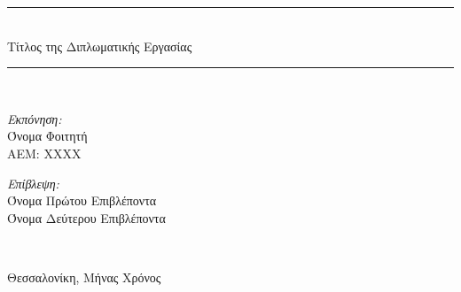 \begin{titlepage}
\begin{center}
    \rule{450pt}{4pt} \\[0.4cm]
    {\fontsize{20.26pt}{1em}\selectfont Τίτλος της Διπλωματικής Εργασίας}

    \rule{350pt}{4pt} \\[4cm]

    \begin{minipage}{0.4\textwidth}
      \begin{flushleft} \large
        \emph{Εκπόνηση:} \\
        Όνομα Φοιτητή \\
        ΑΕΜ: ΧΧΧΧ
      \end{flushleft}
    \end{minipage}
    \begin{minipage}{0.45\textwidth}
      \begin{flushright} \large
        \emph{Επίβλεψη:} \\
        Όνομα Πρώτου Επιβλέποντα\\
        Όνομα Δεύτερου Επιβλέποντα\\
      \end{flushright}
    \end{minipage}
    \\[1cm]
    \vfill

    \large Θεσσαλονίκη, Μήνας Χρόνος

  \end{center}
\end{titlepage}
